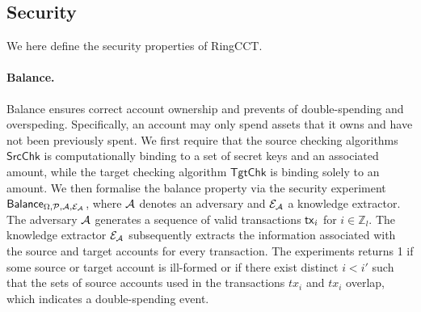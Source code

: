 \subsection{Security}
We here define the security properties of RingCCT.
\paragraph*{Balance.} Balance ensures correct account ownership and prevents of double-spending and overspeding. Specifically, an account may only spend assets that it owns and have not been previously spent. We first require that the source checking algorithms $\mathsf{SrcChk}$ is computationally binding to a set of secret keys and an associated amount, while the target checking algorithm $\mathsf{TgtChk}$ is binding solely to an amount. We then formalise the balance property via the security experiment $\mathsf{Balance}_{\Omega,\mathcal{P},\mathcal{A},\mathcal{E}_{\mathcal{A}}}$, where $\mathcal{A}$ denotes an adversary and $\mathcal{E}_{\mathcal{A}}$ a knowledge extractor. The adversary $\mathcal{A}$ generates a sequence of valid transactions $\mathsf{tx}_i$ for $i \in \mathbb{Z}_l$. The knowledge extractor $\mathcal{E}_{\mathcal{A}}$ subsequently extracts the information associated with the source and target accounts for every transaction. The experiments returns 1 if some source or target account is ill-formed or if there exist distinct $i < i'$ such that the sets of source accounts used in the transactions $tx_i$ and $tx_i$ overlap, which indicates a double-spending event.


